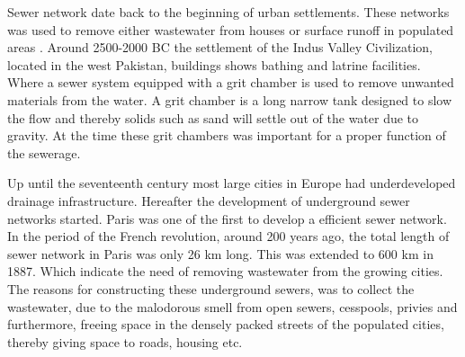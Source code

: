 Sewer network date back to the beginning of urban settlements. These networks was used to remove either wastewater from houses or surface runoff in populated areas . Around 2500-2000 BC the settlement of the Indus Valley Civilization, located in the west Pakistan, buildings shows bathing and latrine facilities. Where a sewer system equipped with a grit chamber is used to remove unwanted materials from the water. A grit chamber is a long narrow tank designed to slow the flow and thereby solids such as sand will settle out of the water due to gravity. At the time these grit chambers was important for a proper function of the sewerage.

Up until the seventeenth century most large cities in Europe had underdeveloped drainage infrastructure. Hereafter the development of underground sewer networks started. Paris was one of the first to develop a efficient sewer network. In the period of the French revolution, around 200 years ago, the total length of sewer network in Paris was only 26 km long. This was extended to 600 km in 1887. Which indicate the need of removing wastewater from the growing cities. The reasons for constructing these underground sewers, was to collect the wastewater, due to the malodorous smell from open sewers, cesspools, privies and furthermore, freeing space in the densely packed streets of the populated cities, thereby giving space to roads, housing etc.
 
